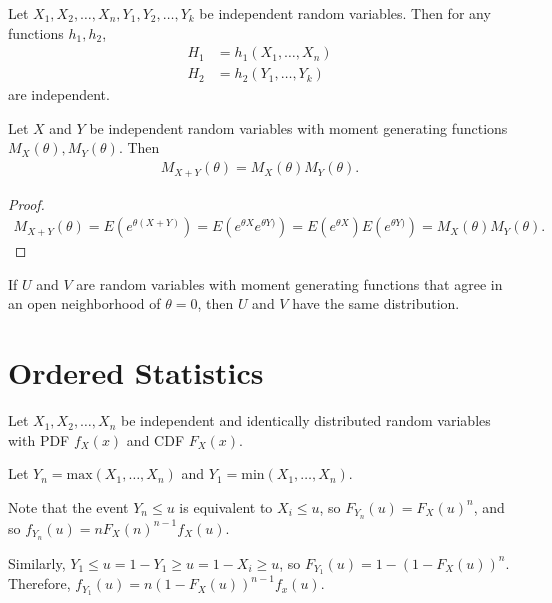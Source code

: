 \begin{thm}
    Let $X_1, X_2, \ldots, X_n, Y_1, Y_2, \ldots, Y_k$ be independent random variables. Then for any functions $h_1, h_2$,
    \begin{align*}
        H_1 &= h_1(X_1, \ldots, X_n) \\
        H_2 &= h_2(Y_1, \ldots, Y_k)
    \end{align*}
    are independent.
\end{thm}

\begin{thm}
    Let $X$ and $Y$ be independent random variables with moment generating functions $M_X(\theta), M_Y(\theta)$. Then
    \begin{align*}
        M_{X+Y}(\theta) = M_X(\theta)M_Y(\theta).
    \end{align*}
\end{thm}

\begin{proof}
    \begin{align}
        M_{X+Y}(\theta) = E\left(e^{\theta(X+Y)}\right) = E\left(e^{\theta X}e^{\theta Y)}\right) = E\left(e^{\theta X}\right)E\left(e^{\theta Y)}\right) = M_X(\theta)M_Y(\theta).
    \end{align}
\end{proof}

\begin{rmk}
    If $U$ and $V$ are random variables with moment generating functions that agree in an open neighborhood of $\theta = 0$, then $U$ and $V$ have the same distribution.
\end{rmk}

\section{Ordered Statistics}

Let $X_1, X_2, \ldots, X_n$ be independent and identically distributed random variables with PDF $f_X(x)$ and CDF $F_X(x)$.

Let $Y_n = \mathrm{max}(X_1, \ldots, X_n)$ and $Y_1 = \mathrm{min}(X_1, \ldots, X_n)$.

Note that the event $Y_n \leq u$ is equivalent to $X_i \leq u$, so $F_{Y_n}(u) = F_X(u)^{n}$, and so $f_{Y_n}(u) = nF_X(n)^{n-1}f_X(u)$.

Similarly, $Y_1 \leq u = 1 - Y_1 \geq u = 1 - X_i \geq u$, so $F_{Y_1}(u) = 1 - \left(1 - F_X(u)\right)^{n}$. Therefore, $f_{Y_1}(u) = n\left(1-F_X(u)\right)^{n-1}f_x(u)$.

